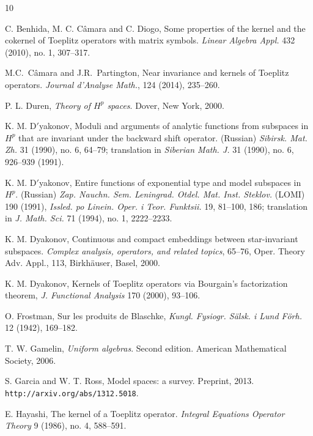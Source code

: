\documentclass[11pt]{article}
\numberwithin{equation}{section}
\begin{document}
\begin{thebibliography}{10}

C. Benhida, M. C. C\^amara and C. Diogo,  Some properties of the kernel and the cokernel of Toeplitz operators with matrix symbols. 
{\em Linear Algebra Appl.} 432 (2010), no. 1, 307--317. 


M.C.~C\^amara and J.R.~Partington,
Near invariance and kernels of Toeplitz operators.
{\em Journal d'Analyse Math.}, 124 (2014), 235--260.

P. L. Duren, {\em Theory of $H^p$ spaces}. Dover, New York, 2000.

K. M.  D${}'$yakonov, 
Moduli and arguments of analytic functions from subspaces in $H^p$ that are invariant under the backward shift operator. (Russian) 
{\em Sibirsk. Mat. Zh.} 31 (1990), no. 6, 64--79; translation in 
{\em Siberian Math. J.} 31 (1990), no. 6, 926--939 (1991).

 K. M.  D${}'$yakonov, Entire functions of exponential type and model subspaces in $H^p$. (Russian) 
{\em Zap. Nauchn. Sem. Leningrad. Otdel. Mat. Inst. Steklov.} (LOMI) 190 (1991), 
{\em Issled. po Linein. Oper. i Teor. Funktsii.} 19, 81--100, 186; translation in 
{\em J. Math. Sci.} 71 (1994), no. 1, 2222--2233. 

K. M. Dyakonov, Continuous and compact embeddings between star-invariant subspaces. 
{\em Complex analysis, operators, and related topics}, 65--76, Oper. Theory Adv. Appl., 113, Birkh\"auser, Basel, 2000.

K. M. Dyakonov, Kernels of Toeplitz operators via Bourgain's
factorization theorem, {\em J. Functional Analysis\/} 170 (2000), 93--106.



O. Frostman,
Sur les produits de Blaschke, {\em Kungl. Fysiogr. S\"alsk. i Lund F\"orh.} 12 (1942), 169--182.

T. W. Gamelin, {\em Uniform algebras}. Second edition.
American Mathematical Society, 2006.

S. Garcia and W. T. Ross, Model spaces: a survey. Preprint, 2013.
{\tt http://arxiv.org/abs/1312.5018}.


E. Hayashi,  The kernel of a Toeplitz operator. {\em Integral Equations Operator Theory\/} 9 (1986), no. 4, 588--591.


\end{thebibliography}
\end{document}
